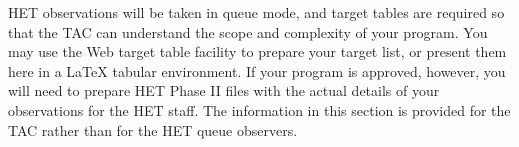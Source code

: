 %



%

\technicaldescription
HET observations will be taken in queue mode, and target tables
are required so that the TAC can understand the scope and complexity
of your program.  You may use the Web target table facility to
prepare your target list, or present them here in a LaTeX tabular
environment. If your program is approved, however, you will need
to prepare HET Phase II files with the actual details of your
observations for the HET staff.  The information in this section
is provided for the TAC rather than for the HET queue observers.


